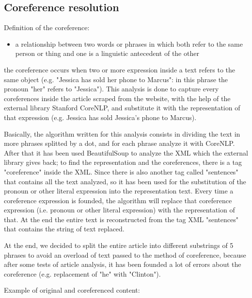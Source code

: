 \subsection{Coreference resolution}
Definition of the coreference:
\begin{itemize}
	\item a relationship between two words or phrases in which both refer to the same person or thing and one is a linguistic antecedent of the other
\end{itemize}
the coreference occurs when two or more expression inside a text refers to the same object (e.g. "Jessica has sold her phone to Marcus": in this phrase the pronoun "her" refers to "Jessica"). 
This analysis is done to capture every coreferences inside the article scraped from the website, with the help of the external library Stanford CoreNLP, and substitute it with the representation of that expression (e.g. Jessica has sold Jessica's phone to Marcus).
\par 
Basically, the algorithm written for this analysis consists in dividing the text in more phrases splitted by a dot, and for each phrase analyze it with CoreNLP. 
After that it has been used BeautifulSoup to analyze the XML which the external library gives back; to find the representation and the coreferences, there is a tag "coreference" inside the XML. 
Since there is also another tag called "sentences" that contains all the text analyzed, so it has been used for the substitution of the pronoun or other literal expression into the representation text. 
Every time a coreference expression is founded, the algorithm will replace that coreference expression (i.e. pronoun or other literal expression) with the representation of that. 
At the end the entire text is reconstructed from the tag XML "sentences" that contains the string of text replaced.
\par
At the end, we decided to split the entire article into different substrings of 5 phrases to avoid an overload of text passed to the method of coreference, because after some tests of article analysis, it has been founded a lot of errors about the coreference (e.g. replacement of "he" with "Clinton"). 
\par
Example of original and coreferenced content:
